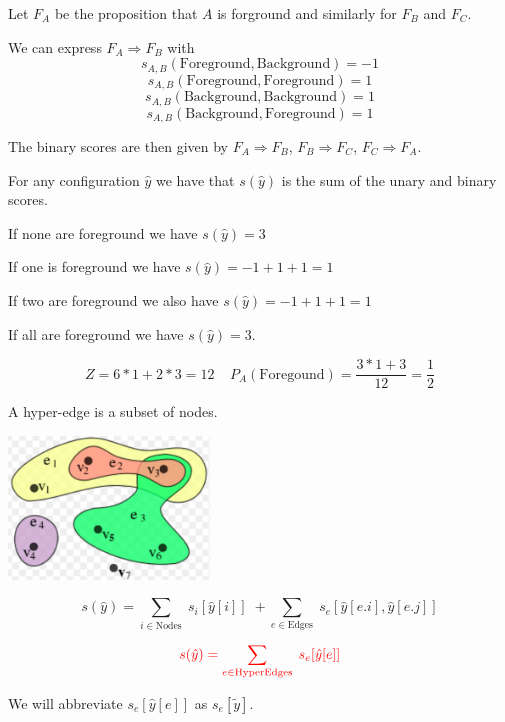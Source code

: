 

\vfill
Let $F_A$ be the proposition that $A$ is forground and similarly for $F_B$ and $F_C$.

\vfill
We can express $F_A \Rightarrow F_B$ with
$$s_{A,B}(\mathrm{Foreground},\mathrm{Background}) = -1$$
$$s_{A,B}(\mathrm{Foreground},\mathrm{Foreground}) = 1$$
$$s_{A,B}(\mathrm{Background},\mathrm{Background}) = 1$$
$$s_{A,B}(\mathrm{Background},\mathrm{Foreground}) = 1$$

\vfill
The binary scores are then given by
$F_A \Rightarrow F_B$, $F_B \Rightarrow F_C$, $F_C \Rightarrow F_A$.


For any configuration $\hat{y}$ we have that $s(\hat{y})$ is the sum of the unary and binary scores.

\vfill
If none are foreground we have $s(\hat{y}) = 3$

\vfill
If one is foreground we have $s(\hat{y}) = -1 + 1+ 1 = 1$

\vfill
If two are foreground we also have $s(\hat{y}) = -1 + 1+ 1 = 1$

\vfill
If all are foreground we have $s(\hat{y}) = 3$.

\vfill
$$Z = 6*1 + 2*3 = 12\;\;\;\;P_A(\mathrm{Foregound}) = \frac{3*1 + 3}{12} = \frac{1}{2}$$




A hyper-edge is a subset of nodes.

\vfill
\centerline{\includegraphics[height = 1.5in]{../images/HyperGraph}}


$$s(\hat{y}) = \sum_{i \in \mathrm{Nodes}}\; s_i[\hat{y}[i]]\; + \sum_{e \in \mathrm{Edges}}\;s_e[\hat{y}[e.i],\hat{y}[e.j]]$$

\vfill

$${\color{red} s(\hat{y}) = \sum_{e \in \mathrm{HyperEdges}}  \; s_e[\hat{y}[e]]}$$



We will abbreviate $s_e[\hat{y}[e]]$ as {\color{red} $s_e[\tilde{y}]$}.


